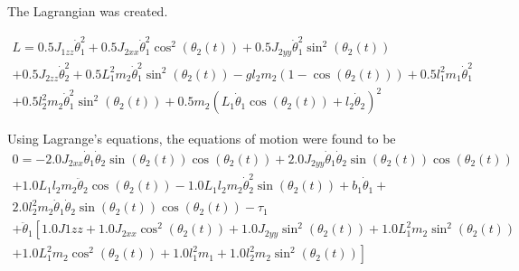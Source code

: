 \documentclass[letterpaper,10pt,oneside]{article}
\begin{document}
The Lagrangian was created.

\begin{multline}
  L =
  0.5 J_{1zz} \dot{\theta}_{1}^{2} + 0.5 J_{2xx} \dot{\theta}_{1}^{2} \cos^{2}{\left(\theta_{2}{\left(t \right)} \right)}
   + 0.5 J_{2yy} \dot{\theta}_{1}^{2} \sin^{2}{\left(\theta_{2}{\left(t \right)} \right)}
      \\
    + 0.5 J_{2zz} \dot{\theta}_{2}^{2} + 0.5 L_{1}^{2} m_{2} \dot{\theta}_{1}^{2} \sin^{2}{\left(\theta_{2}{\left(t \right)} \right)}
   - g l_{2} m_{2} \left(1 - \cos{\left(\theta_{2}{\left(t \right)} \right)}\right) + 0.5 l_{1}^{2} m_{1} \dot{\theta}_{1}^{2}
      \\
    + 0.5 l_{2}^{2} m_{2} \dot{\theta}_{1}^{2} \sin^{2}{\left(\theta_{2}{\left(t \right)} \right)}
    + 0.5 m_{2} \left(L_{1} \dot{\theta}_{1} \cos{\left(\theta_{2}{\left(t \right)} \right)} + l_{2} \dot{\theta}_{2}\right)^{2}
\end{multline}

Using Lagrange's equations, the equations of motion were found to be \\

\begin{multline}
  0 = - 2.0 J_{2xx} \dot{\theta}_{1} \dot{\theta}_{2} \sin{\left(\theta_{2}{\left(t \right)} \right)} \cos{\left(\theta_{2}{\left(t \right)} \right)} + 2.0 J_{2yy} \dot{\theta}_{1} \dot{\theta}_{2} \sin{\left(\theta_{2}{\left(t \right)} \right)} \cos{\left(\theta_{2}{\left(t \right)} \right)}
        \\
   + 1.0 L_{1} l_{2} m_{2} \ddot{\theta}_{2} \cos{\left(\theta_{2}{\left(t \right)} \right)} - 1.0 L_{1} l_{2} m_{2} \dot{\theta}_{2}^{2} \sin{\left(\theta_{2}{\left(t \right)} \right)} + b_{1} \dot{\theta}_{1} + \\ 2.0 l_{2}^{2} m_{2} \dot{\theta}_{1} \dot{\theta}_{2} \sin{\left(\theta_{2}{\left(t \right)} \right)} \cos{\left(\theta_{2}{\left(t \right)} \right)} - \tau_{1}
    \\
    + \ddot{\theta}_{1} \left[1.0 J1zz + 1.0 J_{2xx} \cos^{2}{\left(\theta_{2}{\left(t \right)} \right)} + 1.0 J_{2yy} \sin^{2}{\left(\theta_{2}{\left(t \right)} \right)} + 1.0 L_{1}^{2} m_{2} \sin^{2}{\left(\theta_{2}{\left(t \right)} \right)}
      \right.
      \\
      \left.
     + 1.0 L_{1}^{2} m_{2} \cos^{2}{\left(\theta_{2}{\left(t \right)} \right)} + 1.0 l_{1}^{2} m_{1} + 1.0 l_{2}^{2} m_{2} \sin^{2}{\left(\theta_{2}{\left(t \right)} \right)}\right]
\end{multline}
\end{document}
